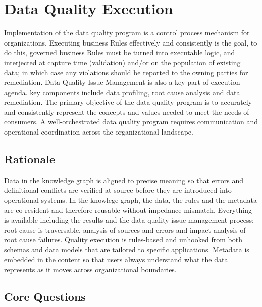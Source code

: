 \section{Data Quality Execution}\label{sec:b-3-3} %

Implementation of the data quality program is a control process mechanism for organizations.
Executing business Rules effectively and consistently is the goal, to do this, governed business Rules must be turned into executable logic, and interjected at capture time (validation) and/or on the population of existing data; in which case any violations should be reported to the owning parties for remediation.
Data Quality Issue Management is also a key part of execution agenda. key components include data profiling, root cause analysis and data remediation.
The primary objective of the data quality program is to accurately and consistently represent the concepts and values needed to meet the needs of consumers.
A well-orchestrated data quality program requires communication and operational coordination across the organizational landscape.

\subsection*{ Rationale}

Data in the knowledge graph is aligned to precise meaning so that errors and definitional conflicts are verified at source before they are introduced into operational systems.
In the knowlege graph, the data, the rules and the metadata are co-resident and therefore reusable without impedance mismatch.
Everything is available including the results and the data quality issue management process: root cause is traversable, analysis of sources and errors and impact analysis of root cause failures.
Quality execution is rules-based and unhooked from both schemas and data models that are tailored to specific applications.
Metadata is embedded in the content so that users always understand what the data represents as it moves across organizational boundaries.

\subsection*{Core Questions}

